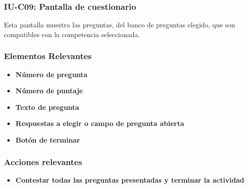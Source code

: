 
\subsubsection{IU-C09: Pantalla de cuestionario}

 Esta pantalla muestra las preguntas, del banco de preguntas elegido, que son compatibles con la competencia seleccionada.


\subsubsection{Elementos Relevantes}

    \begin{itemize}
    \item {\bf Número de pregunta}
    \item {\bf Número de puntaje}
    \item {\bf Texto de pregunta}
    \item {\bf Respuestas a elegir o campo de pregunta abierta}
    \item {\bf Botón de terminar}
    \end{itemize}

\subsubsection{Acciones relevantes}

    \begin{itemize}
    \item {\bf Contestar todas las preguntas presentadas y terminar la actividad}

    \end{itemize}

\clearpage
